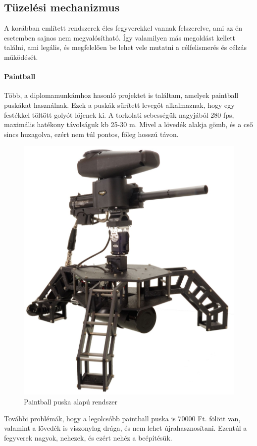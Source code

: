 \documentclass[12pt,a4paper]{article}
\begin{document}
\pagebreak

\subsection{Tüzelési mechanizmus}

A korábban említett rendszerek éles fegyverekkel vannak felszerelve, ami az én esetemben sajnos nem megvalósítható. Így valamilyen más megoldást kellett találni, ami legális, és megfelelően be lehet vele mutatni a célfelismerés és célzás működését. 


\paragraph{Paintball}

Több, a diplomamunkámhoz hasonló projektet is találtam, amelyek paintball puskákat használnak. Ezek a puskák sűrített levegőt alkalmaznak, hogy egy festékkel töltött golyót lőjenek ki. A torkolati sebességük nagyjából 280 fps, maximális hatékony távolságuk kb 25-30 m. Mivel a lövedék alakja gömb, és a cső sincs huzagolva, ezért nem túl pontos, főleg hosszú távon.\\

\begin{figure}[h!]
	\centering
	\includegraphics[width=0.6\linewidth]{irod_paintball}
	\caption{Paintball puska alapú rendszer}
	\label{fig:irod_paintball}
\end{figure}

További problémák, hogy a legolcsóbb paintball puska is 70000 Ft. fölött van, valamint a lövedék is viszonylag drága, és nem lehet újrahasznosítani. Ezentúl a fegyverek nagyok, nehezek, és ezért nehéz a beépítésük. 
\end{document}
